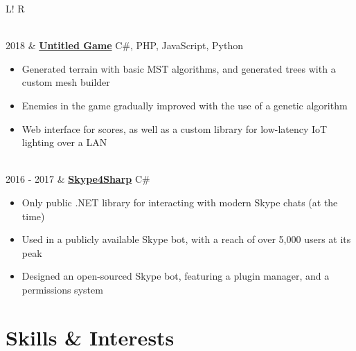 \documentclass[10pt, a4paper]{article}
\newcommand\vsep{\color{lightgray} \vrule width 0.5pt}
\newcommand\sect[1]{\section*{\Large\sc #1}}
\newcommand\itemizespace{\vspace{-0.65\baselineskip}}
\begin{document}
\begin{tabular}{L!{\vsep}R}
\begin{itemize}[label=\raisebox{0.25ex}{\tiny$\bullet$}]
                    \end{itemize} \\
                2018 & \href{https://github.com/lin-e/CSProject2017}{\textbf{Untitled Game}} \hfill C\#, PHP, JavaScript, Python
                    \begin{itemize}[label=\raisebox{0.25ex}{\tiny$\bullet$}]
                        \setlength{\itemindent}{-0.1in}
                        \item Generated terrain with basic MST algorithms, and generated trees with a custom mesh builder
                        \item Enemies in the game gradually improved with the use of a genetic algorithm
                        \item Web interface for scores, as well as a custom library for low-latency IoT lighting over a LAN
                        \itemizespace
                    \end{itemize} \\
                2016 - 2017 & \href{https://github.com/lin-e/Skype4Sharp}{\textbf{Skype4Sharp}} \hfill C\#
                    \begin{itemize}[label=\raisebox{0.25ex}{\tiny$\bullet$}]
                        \setlength{\itemindent}{-0.1in}
                        \item Only public .NET library for interacting with modern Skype chats (at the time)
                        \item Used in a publicly available Skype bot, with a reach of over 5,000 users at its peak
                        \item Designed an open-sourced Skype bot, featuring a plugin manager, and a permissions system
                        \vspace{-1.1\baselineskip}
                    \end{itemize}
            \end{tabular}
        \sect{Skills \& Interests}
\end{document}
